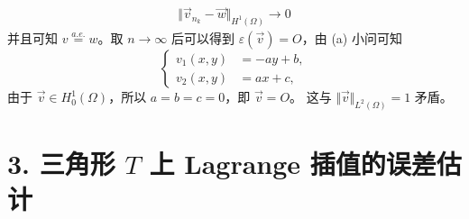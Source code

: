 \documentclass[a4paper]{article}
\begin{document}
\begin{enumerate}
\begin{gather}
                    \Vert \vec{v}_{n_k} - \vec{w}\Vert_{H^1(\Omega)} \to 0
                \end{gather}
                并且可知 $v \overset{a.e.}{=} w$。取 $n\to \infty$ 后可以得到
                $\varepsilon(\vec{v}) = O$，由 (a) 小问可知
                \begin{equation}
                    \left\{
                    \begin{aligned}
                        v_1(x,y) &= -ay + b,\\  
                        v_2(x,y) &= ax + c,
                    \end{aligned}
                    \right.
                \end{equation}
                由于 $\vec{v} \in H_0^1(\Omega)$，所以 $a = b = c = 0$，即 $\vec{v} = O$。
                这与 $\Vert \vec{v} \Vert_{L^2(\Omega)} = 1$ 矛盾。
\end{enumerate}

\section*{3. 三角形 $T$ 上 Lagrange 插值的误差估计}
\end{document}
